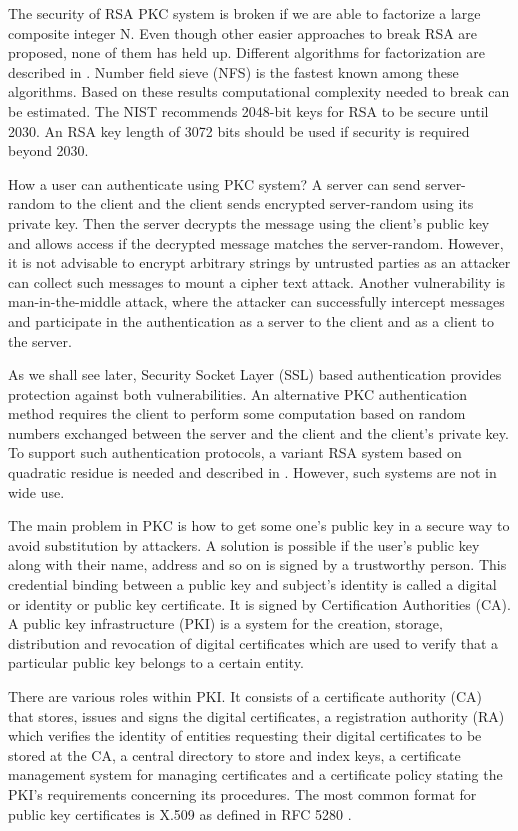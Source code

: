 \begin{multicols}{2}
The security of RSA PKC system is broken if we are able to factorize a large composite integer N. Even though other easier approaches to break RSA are proposed, none of them has held up. Different algorithms for factorization are described in \cite{key1}. Number field sieve (NFS) is the fastest known among these algorithms. Based on these results computational complexity needed to break can be estimated. The NIST recommends 2048-bit keys for RSA to be secure until 2030. An RSA key length of 3072 bits should be used if security is required beyond 2030. 

How a user can authenticate using PKC system? A server can send server-random to the client and the client sends encrypted server-random using its private key. Then the server decrypts the message using the client's public key and allows access if the decrypted message matches the server-random. However, it is not advisable to encrypt arbitrary strings by untrusted parties as an attacker can collect such messages to mount a cipher text attack. Another vulnerability is man-in-the-middle attack, where the attacker can successfully intercept messages and participate in the authentication as a server to the client and as a client to the server.

As we shall see later, Security Socket Layer (SSL) based authentication provides protection against both vulnerabilities. An alternative PKC authentication method requires the client to perform some computation based on random numbers exchanged between the server and the client and the client's private key. To support such authentication protocols, a variant RSA system based on quadratic residue is needed and described in \cite{key1}. However, such systems are not in wide use. 

The main problem in PKC is how to get some one's public key in a secure way to avoid substitution by attackers. A solution is possible if the user's public key along with their name, address and so on is signed by a trustworthy person. This credential binding between a public key and subject's identity is called a digital or identity or public key certificate. It is signed by Certification Authorities (CA). A public key infrastructure (PKI) is a system for the creation, storage, distribution and revocation of digital certificates which are used to verify that a particular public key belongs to a certain entity. 

There are various roles within PKI. It consists of a certificate authority (CA) that stores, issues and signs the digital certificates, a registration authority (RA) which verifies the identity of entities requesting their digital certificates to be stored at the CA, a central directory to store and index keys, a certificate management system for managing certificates and a certificate policy stating the PKI's requirements concerning its procedures. The most common format for public key certificates is X.509 as defined in RFC 5280 \cite{key15}.


\end{multicols}
